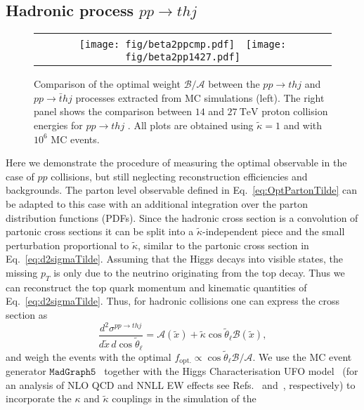 \documentclass[11pt,a4paper]{article}
\newcommand {\e}[1]{\mathrm{~#1}}
\newcommand{\mc}[1]{\mathcal{#1}}
\newcommand{\mrm}[1]{\mathrm{#1}}
\begin{document}
\subsection{Hadronic process $pp \to t h j$}
\begin{figure}[!b]
	\centering
	\begin{tabular}{c}
		\texttt{[image: fig/beta2ppcmp.pdf]}\ \ \texttt{[image: fig/beta2pp1427.pdf]}
	\end{tabular}
	\caption{Comparison of the optimal weight $\mc{B}/\mc{A}$ between the $pp \to t h j$ and $pp \to \bar t h j$ processes extracted from MC simulations (left). The right panel shows the comparison between $14$ and $27\e{TeV}$ proton collision energies for $pp \to thj$ . All plots are obtained using $\tilde{\kappa}=1$ and with $10^6$ MC events.}
	\label{fig:extracted_beta_2}
\end{figure}
Here we demonstrate the procedure of measuring the optimal observable in the case of $pp$ collisions, but still neglecting reconstruction efficiencies and backgrounds. The parton level observable
defined in Eq.~\eqref{eq:OptPartonTilde} can be adapted to this case with an
additional integration over the parton distribution functions
(PDFs). Since the hadronic cross section is a convolution of partonic
cross sections it can be split into a $\tilde \kappa$-independent piece and the
small perturbation proportional to $\tilde \kappa$, similar to the partonic cross section in Eq.~\eqref{eq:d2sigmaTilde}. Assuming that the
Higgs decays into visible states, the missing $p_T$ is only due to the
neutrino originating from the top decay. Thus we can reconstruct the top quark momentum and
kinematic quantities of
Eq.~\eqref{eq:d2sigmaTilde}. Thus, for hadronic collisions one can
express the cross section as
\begin{equation}
\label{eq:HadronicThj}  
\frac{d^2\sigma^{pp\to thj }}{d\tilde x\,d\cos \tilde\theta_\ell} = \mc{A}(\tilde x) + \tilde \kappa \cos\tilde \theta_\ell \mc{B} (\tilde x) ,
\end{equation}
and weigh the events with the optimal
$f_\mrm{opt.}  \propto \cos\tilde\theta_\ell \mc{B}/ \mc{A}$. We use the MC event generator
$\texttt{MadGraph5}$~\cite{Alwall:2014hca,1212.3460} together with the Higgs
Characterisation UFO model~\cite{Degrande:2011ua, Artoisenet:2013puc} (for an analysis of NLO QCD and NNLL EW effects see  Refs.~\cite{1407.5089, 1504.00611} and~\cite{1907.04343}, respectively) to incorporate the
$\kappa$ and $\tilde \kappa$ couplings in the simulation of the
\end{document}

